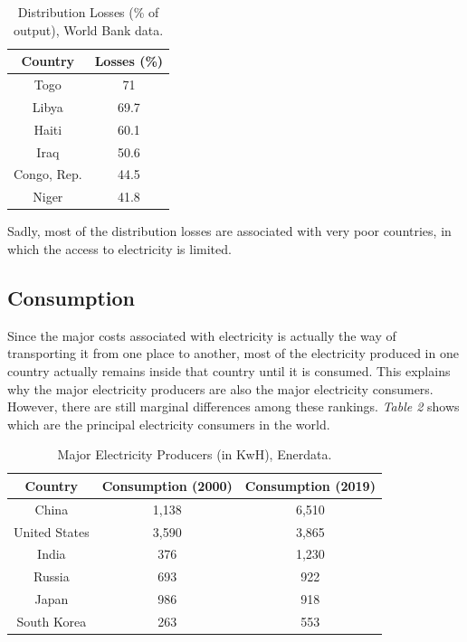 \documentclass{book}
\begin{document}
\bigskip
\begin{table}[H]
\begin{center}
\begin{tabular}{|c|c|}
\hline
Country & Losses (\%)\\
\hline
Togo & 71\\
Libya & 69.7\\
Haiti & 60.1\\
Iraq & 50.6\\
Congo, Rep. & 44.5\\
Niger & 41.8\\
\hline
\end{tabular}
\caption{Distribution Losses (\% of output), World Bank data.}
\end{center}
\end{table}

Sadly, most of the distribution losses are associated with very poor countries, in which the access to electricity is limited. 

\subsection*{Consumption}

Since the major costs associated with electricity is actually the way of transporting it from one place to another, most of the electricity produced in one country actually remains inside that country until it is consumed. This explains why the major electricity producers are also the major electricity consumers. However, there are still marginal differences among these rankings. \textit{Table 2} shows which are the principal electricity consumers in the world.

\bigskip
\begin{table}[H]
\begin{center}
\begin{tabular}{|c|c|c|}
\hline
Country & Consumption (2000) & Consumption (2019)\\
\hline
China & 1,138 & 6,510\\
United States & 3,590 & 3,865\\
India & 376 & 1,230\\
Russia & 693 & 922\\
Japan & 986 & 918\\
South Korea & 263 & 553\\
\hline
\end{tabular}
\caption{Major Electricity Producers (in KwH), Enerdata.}
\end{center}
\end{table}
\end{document}
